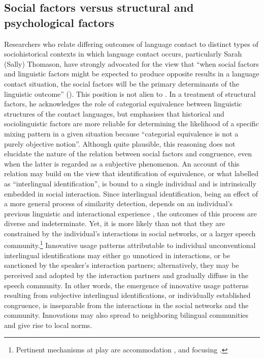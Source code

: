 \subsection{Social factors versus structural and psychological factors}{\label{social-factors}}
Researchers who relate differing outcomes of language contact to distinct types of sociohistorical contexts in which language contact occurs, particularly Sarah (Sally) Thomason, have strongly advocated for the view that ``when social factors and linguistic factors might be expected to produce opposite results in a language contact situation, the social factors will be the primary determinants of the linguistic outcome'' (\citeyear[][42]{thomason-08}). This position is not alien to \citet[][247]{muysken-bilingual-2000}. In a treatment of structural factors, he acknowledges the role of categorial equivalence between linguistic structures of the contact languages, but emphasises that historical and sociolinguistic factors are more reliable for determining the likelihood of a specific mixing pattern in a given situation because ``categorial equivalence is not a purely objective notion''. Although quite plausible, this reasoning does not elucidate the nature of the relation between social factors and congruence, even when the latter is regarded as a subjective phenomenon. An account of this relation may build on the view that identification of equivalence, or what \citet[][]{weinreich-53} labelled as ``interlingual identification'', is bound to a single individual \citep[see the discussion in][37]{gardner-chloros_code-switching_2009} and is intrinsically embedded in social interaction. Since interlingual identification, being an effect of a more general process of similarity detection, depends on an individual's previous linguistic and interactional experience \citep[for more details, see][]{hakimov-17,hakimov-backus-20-intro}, the outcomes of this process are diverse and indeterminate. Yet, it is more likely than not that they are constrained by the individual's interactions in social networks, or a larger speech community.\footnote{Pertinent mechanisms at play are accommodation \citep{giles-80}, and focusing \citep{lepage-tabouretkeller}.} Innovative usage patterns attributable to individual unconventional interlingual identifications may either go unnoticed in interactions, or be sanctioned by the speaker's interaction partners; alternatively, they may be perceived and adopted by the interaction partners and gradually diffuse in the speech community. In other words, the emergence of innovative usage patterns resulting from subjective interlingual identifications, or individually established congruence, is inseparable from the interactions in the social networks and the community. Innovations may also spread to neighboring bilingual communities and give rise to local norms.


